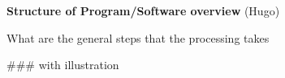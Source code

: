 \textbf{Structure of Program/Software overview} (Hugo) 

What are the general steps that the processing takes
    
    
### with illustration